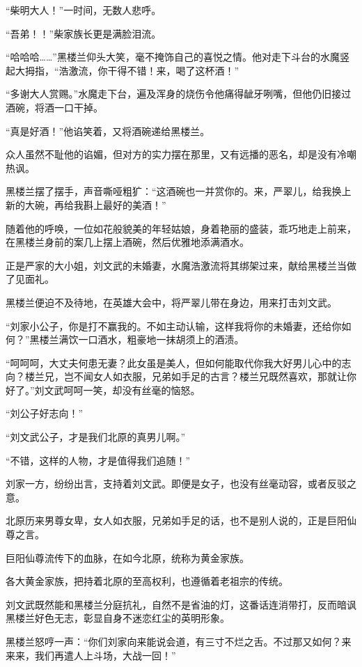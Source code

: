 \begin{this_body}
“柴明大人！”一时间，无数人悲呼。

“吾弟！！”柴家族长更是满脸泪流。

“哈哈哈……”黑楼兰仰头大笑，毫不掩饰自己的喜悦之情。他对走下斗台的水魔竖起大拇指，“浩激流，你干得不错！来，喝了这杯酒！”

“多谢大人赏赐。”水魔走下台，遍及浑身的烧伤令他痛得龇牙咧嘴，但他仍旧接过酒碗，将酒一口干掉。

“真是好酒！”他谄笑着，又将酒碗递给黑楼兰。

众人虽然不耻他的谄媚，但对方的实力摆在那里，又有远播的恶名，却是没有冷嘲热讽。

黑楼兰摆了摆手，声音嘶哑粗犷：“这酒碗也一并赏你的。来，严翠儿，给我换上新的大碗，再给我斟上最好的美酒！”

随着他的呼唤，一位如花般貌美的年轻姑娘，身着艳丽的盛装，乖巧地走上前来，在黑楼兰身前的案几上摆上酒碗，然后优雅地添满酒水。

正是严家的大小姐，刘文武的未婚妻，水魔浩激流将其绑架过来，献给黑楼兰当做了见面礼。

黑楼兰便迫不及待地，在英雄大会中，将严翠儿带在身边，用来打击刘文武。

“刘家小公子，你是打不赢我的。不如主动认输，这样我将你的未婚妻，还给你如何？”黑楼兰满饮一口酒水，粗豪地一抹胡须上的酒渍。

“呵呵呵，大丈夫何患无妻？此女虽是美人，但如何能取代你我大好男儿心中的志向？楼兰兄，岂不闻女人如衣服，兄弟如手足的古言？楼兰兄既然喜欢，那就让你好了。”刘文武呵呵一笑，却没有丝毫的恼怒。

“刘公子好志向！”

“刘文武公子，才是我们北原的真男儿啊。”

“不错，这样的人物，才是值得我们追随！”

刘家一方，纷纷出言，支持着刘文武。即便是女子，也没有丝毫动容，或者反驳之意。

北原历来男尊女卑，女人如衣服，兄弟如手足的话，也不是别人说的，正是巨阳仙尊之言。

巨阳仙尊流传下的血脉，在如今北原，统称为黄金家族。

各大黄金家族，把持着北原的至高权利，也遵循着老祖宗的传统。

刘文武既然能和黑楼兰分庭抗礼，自然不是省油的灯，这番话连消带打，反而暗讽黑楼兰好色无志，彰显自身不迷恋红尘的英明形象。

黑楼兰怒哼一声：“你们刘家向来能说会道，有三寸不烂之舌。不过那又如何？来来来，我们再遣人上斗场，大战一回！”


\end{this_body}
